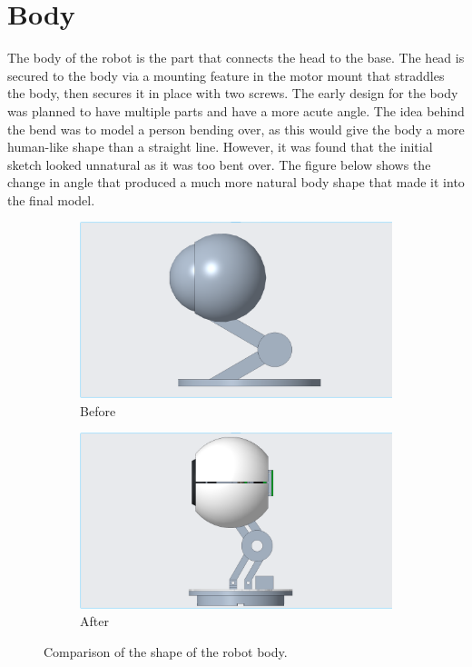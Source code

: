\section{Body}
The body of the robot is the part that connects the head to the base. The head is secured to the body via a mounting feature in the motor mount that straddles the body, then secures it in place with two screws. The early design for the body was planned to have multiple parts and have a more acute angle. The idea behind the bend was to model a person bending over, as this would give the body a more human-like shape than a straight line. However, it was found that the initial sketch looked unnatural as it was too bent over. The figure below shows the change in angle that produced a much more natural body shape that made it into the final model.
\begin{figure}[h]
    \centering
    \begin{subfigure}{0.4\linewidth}
        \includegraphics[width=\linewidth]{Thesis/ch2/side-view2.png}
        \caption{Before}
    \end{subfigure}
    \begin{subfigure}{0.4\linewidth}
        \includegraphics[width=\linewidth]{Thesis/ch2/side-view1.png}
        \caption{After}
    \end{subfigure}
    \caption{Comparison of the shape of the robot body.}
    \label{fig:body_comparison}
\end{figure}

